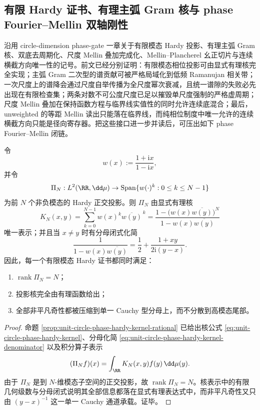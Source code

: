 \subsection{有限 Hardy 证书、有理主弧 Gram 核与 phase Fourier--Mellin 双轴刚性}\label{subsec:conclusion-phase-gram-mellin-hardy-radial-rigidity}
沿用 circle-dimension phase-gate 一章关于有限模态 Hardy 投影、有理主弧 Gram 核、双底去周期化、尺度 Mellin 叠加完成化、Mellin--Plancherel 幺正切片与连续横截方向唯一性的记号。前文已经分别证明：有限模态相位投影可由显式有理核完全实现；主弧 Gram 二次型的谱贡献可被严格局域化到低频 Ramanujan 相关带；一次尺度上的谱降会通过尺度自举传播为全尺度幂次衰减，且统一谱隙的失败必先出现在有限检查集；两条对数不可公度尺度已足以摧毁单尺度强制的严格虚周期；尺度 Mellin 叠加在保持函数方程与临界线实值性的同时允许连续底混合；最后，unweighted 的等距 Mellin 读出只能落在临界线，而纯相位制度中唯一允许的连续横截方向只能是径向寄存器。把这些接口进一步并读后，可压出如下 phase Fourier--Mellin 闭链。

\begin{proposition}\label{prop:conclusion-finite-mode-hardy-rational-reproducibility}
令
\[
w(x):=\frac{1+\mathrm{i}x}{1-\mathrm{i}x},
\]
并令
\[
\Pi_N:L^2(\RR,\dd\mu)\to \mathrm{Span}\{w(\cdot)^k:0\le k\le N-1\}
\]
为前 \(N\) 个非负模态的 Hardy 正交投影。则 \(\Pi_N\) 由显式有理核
\[
K_N(x,y)
=
\sum_{k=0}^{N-1}w(x)^k\overline{w(y)}^{\,k}
=
\frac{1-\bigl(w(x)\overline{w(y)}\bigr)^N}{1-w(x)\overline{w(y)}}
\]
唯一表示；并且当 \(x\neq y\) 时有分母闭式化简
\[
\frac{1}{1-w(x)\overline{w(y)}}
=
\frac12+\frac{1+xy}{2\mathrm{i}(y-x)}.
\]
因此，每一个有限模态 Hardy 证书都同时满足：
\begin{enumerate}
  \item \(\operatorname{rank}\Pi_N=N\)；
  \item 投影核完全由有理函数给出；
  \item 全部非平凡奇性都被压缩到单一 Cauchy 型分母上，而不分散到高模态尾部。
\end{enumerate}
\end{proposition}
\begin{proof}
命题 \ref{prop:unit-circle-phase-hardy-kernel-rational} 已给出核公式
\eqref{eq:unit-circle-phase-hardy-kernel}、分母化简
\eqref{eq:unit-circle-phase-hardy-kernel-denominator} 以及积分算子表示
\[
(\Pi_N f)(x)=\int_{\RR}K_N(x,y)f(y)\,\dd\mu(y).
\]
由于 \(\Pi_N\) 是到 \(N\)-维模态子空间的正交投影，故 \(\operatorname{rank}\Pi_N=N\)。核表示中的有限几何级数与分母闭式说明其全部信息都落在显式有理表达式中，而非平凡奇性又只由 \((y-x)^{-1}\) 这一单一 Cauchy 通道承载。证毕。
\end{proof}

